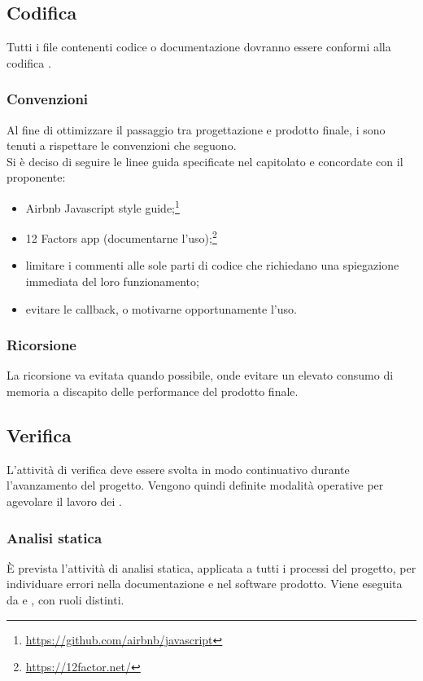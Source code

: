 \subsection{Codifica}
Tutti i file contenenti codice o documentazione dovranno essere conformi alla codifica .

\subsubsection{Convenzioni} \label{sec:convenzioni}
Al fine di ottimizzare il passaggio tra progettazione e prodotto finale, i \Programmatori\space sono tenuti a rispettare le convenzioni che seguono.\\
Si è deciso di seguire le linee guida specificate nel capitolato e concordate con il proponente:
\begin{itemize}
	\item Airbnb Javascript style guide;\footnote{\url{https://github.com/airbnb/javascript}}
	\item 12 Factors app (documentarne l'uso);\footnote{\url{https://12factor.net/}}
	\item limitare i commenti alle sole parti di codice che richiedano una spiegazione immediata del loro funzionamento;
	\item evitare le callback, o motivarne opportunamente l’uso.
\end{itemize}
\subsubsection{Ricorsione}
La ricorsione va evitata quando possibile, onde evitare un elevato consumo di memoria a discapito delle performance del prodotto finale. 

\subsection{Verifica}
L’attività di verifica deve essere svolta in modo continuativo durante l'avanzamento del progetto. Vengono quindi definite modalità operative per agevolare il lavoro dei \Verificatori.

\subsubsection{Analisi statica}
È prevista l'attività di analisi statica, applicata a tutti i processi del progetto, per individuare errori nella documentazione e nel software prodotto. Viene eseguita da \Verificatori{} e \Programmatori{}, con ruoli distinti.

